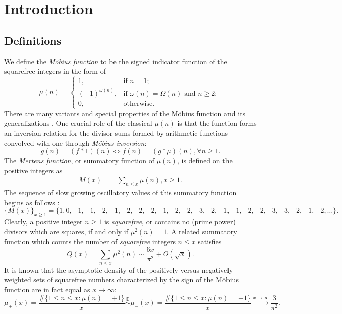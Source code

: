 \documentclass[11pt,reqno,a4letter]{article}
\numberwithin{figure}{section}
\numberwithin{table}{section}
\newcommand{\cf}{\textit{cf.\ }}
\newcommand{\seqnum}[1]{\href{http://oeis.org/#1}{\color{ProcessBlue}{\underline{#1}}}}
\theoremstyle{plain}
\numberwithin{theorem}{section}
\theoremstyle{definition}
\begin{document}

\newpage
\section{Introduction} 
\label{subSection_MertensMxClassical_Intro} 

\subsection{Definitions} 

We define the \emph{M\"obius function} to be the signed indicator function 
of the squarefree integers in the form of \cite[\seqnum{A008683}]{OEIS} 
\[
\mu(n) = \begin{cases} 
     1, & \text{if $n = 1$; } \\ 
     (-1)^{\omega(n)}, & \text{if $\omega(n) = \Omega(n)$ and $n \geq 2$; } \\ 
     0, & \text{otherwise.} 
     \end{cases} 
\]
There are many variants and special properties of the M\"obius function 
and its generalizations \cite[\cf \S 2]{HANDBOOKNT-2004}. 
One crucial role of the classical $\mu(n)$ is that the function forms an inversion relation 
for the divisor sums formed by arithmetic functions convolved with one through \emph{M\"obius inversion}: 
\[
g(n) = (f \ast 1)(n) \iff f(n) = (g \ast \mu)(n), \forall n \geq 1. 
\]
The \emph{Mertens function}, or summatory function of $\mu(n)$, is defined on the 
positive integers as 
\begin{align*} 
M(x) & = \sum_{n \leq x} \mu(n), x \geq 1. 
\end{align*} 
The sequence of slow growing oscillatory values of this 
summatory function begins as follows \cite[\seqnum{A002321}]{OEIS}: 
\[
\{M(x)\}_{x \geq 1} = \{1, 0, -1, -1, -2, -1, -2, -2, -2, -1, -2, -2, -3, -2, 
     -1, -1, -2, -2, -3, -3, -2, -1, -2, \ldots\}. 
\]
Clearly, a positive integer $n \geq 1$ is \emph{squarefree}, or contains no (prime power) divisors which are 
squares, if and only if $\mu^2(n) = 1$. 
A related summatory function which counts the 
number of \emph{squarefree} integers $n \leq x$ satisfies 
\cite[\S 18.6]{HARDYWRIGHT} \cite[\seqnum{A013928}]{OEIS} 
\[ 
Q(x) = \sum_{n \leq x} \mu^2(n) \sim \frac{6x}{\pi^2} + O\left(\sqrt{x}\right). 
\] 
It is known that the asymptotic density of the positively versus negatively 
weighted sets of squarefree numbers characterized by the sign of the 
M\"obius function are in fact equal as $x \rightarrow \infty$: 
\[
\mu_{+}(x) = \frac{\#\{1 \leq n \leq x: \mu(n) = +1\}}{x} \overset{\mathbb{E}}{\sim} 
     \mu_{-}(x) = \frac{\#\{1 \leq n \leq x: \mu(n) = -1\}}{x} 
     \xrightarrow{x \rightarrow \infty} \frac{3}{\pi^2}. 
\]
\end{document}
